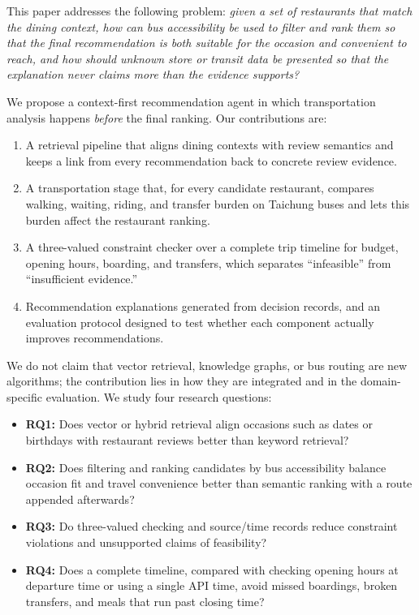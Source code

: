 \documentclass[conference]{IEEEtran}
\begin{document}
This paper addresses the following problem: \emph{given a set of restaurants that match the dining context, how can bus accessibility be used to filter and rank them so that the final recommendation is both suitable for the occasion and convenient to reach, and how should unknown store or transit data be presented so that the explanation never claims more than the evidence supports?}

We propose a context-first recommendation agent in which transportation analysis happens \emph{before} the final ranking. Our contributions are:
\begin{enumerate}
\item A retrieval pipeline that aligns dining contexts with review semantics and keeps a link from every recommendation back to concrete review evidence.
\item A transportation stage that, for every candidate restaurant, compares walking, waiting, riding, and transfer burden on Taichung buses and lets this burden affect the restaurant ranking.
\item A three-valued constraint checker over a complete trip timeline for budget, opening hours, boarding, and transfers, which separates ``infeasible'' from ``insufficient evidence.''
\item Recommendation explanations generated from decision records, and an evaluation protocol designed to test whether each component actually improves recommendations.
\end{enumerate}

We do not claim that vector retrieval, knowledge graphs, or bus routing are new algorithms; the contribution lies in how they are integrated and in the domain-specific evaluation. We study four research questions:
\begin{itemize}
\item \textbf{RQ1:} Does vector or hybrid retrieval align occasions such as dates or birthdays with restaurant reviews better than keyword retrieval?
\item \textbf{RQ2:} Does filtering and ranking candidates by bus accessibility balance occasion fit and travel convenience better than semantic ranking with a route appended afterwards?
\item \textbf{RQ3:} Do three-valued checking and source/time records reduce constraint violations and unsupported claims of feasibility?
\item \textbf{RQ4:} Does a complete timeline, compared with checking opening hours at departure time or using a single API time, avoid missed boardings, broken transfers, and meals that run past closing time?
\end{itemize}
\end{document}
